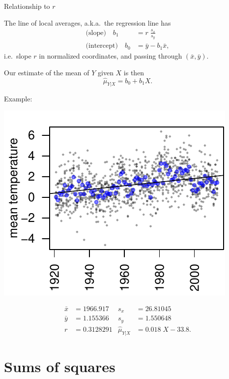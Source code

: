 \begin{frame}{Relationship to $r$}

    The line of local averages,
    a.k.a.\ the \alert{regression line}
    has 
    \begin{align*}
        \text{(slope)}\quad b_1 &= r \; \frac{s_x}{s_y} \\
        \text{(intercept)}\quad b_0 &= \bar y - b_1 \bar x,
    \end{align*}
    i.e.\ slope $r$ in normalized coordinates,
    and passing through $(\bar x, \bar y)$.

    \vspace{2em}

    Our estimate of the mean of $Y$ given $X$ is then
    \[
        \hat \mu_{Y|X} = b_0 + b_1 X .
    \]

\end{frame}

\begin{frame}{Example:}

    \centering
        \includegraphics{usc-temps-regression}

    \begin{align*}
        \bar x &= 1966.917 & s_x &= 26.81045 \\
        \bar y &= 1.155366 & s_y &= 1.550648 \\
               r &= 0.3128291 & \hat \mu_{Y|X} &= 0.018 \; X - 33.8 .
    \end{align*}

\end{frame}

\section{Sums of squares}

